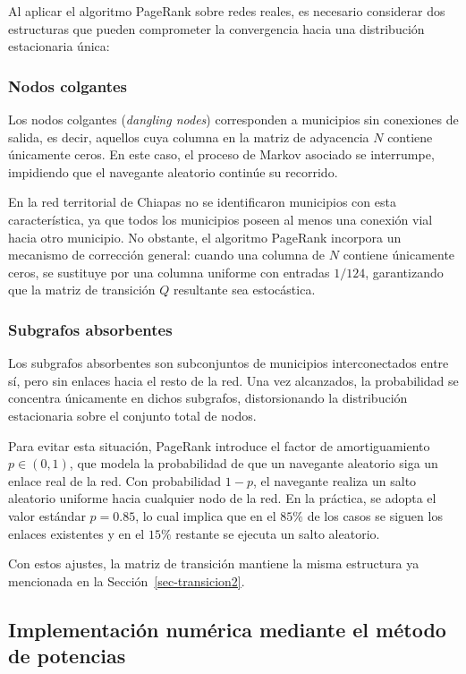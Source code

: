 \documentclass[
  spanish,
  us-letterpaper,
]{scrreprt}
\numberwithin{equation}{section}
\begin{document}
Al aplicar el algoritmo PageRank sobre redes reales, es necesario
considerar dos estructuras que pueden comprometer la convergencia hacia
una distribución estacionaria única:

\subsubsection{Nodos colgantes}\label{nodos-colgantes}

Los nodos colgantes (\emph{dangling nodes}) corresponden a municipios
sin conexiones de salida, es decir, aquellos cuya columna en la matriz
de adyacencia \(N\) contiene únicamente ceros. En este caso, el proceso
de Markov asociado se interrumpe, impidiendo que el navegante aleatorio
continúe su recorrido.

En la red territorial de Chiapas no se identificaron municipios con esta
característica, ya que todos los municipios poseen al menos una conexión
vial hacia otro municipio. No obstante, el algoritmo PageRank incorpora
un mecanismo de corrección general: cuando una columna de \(N\) contiene
únicamente ceros, se sustituye por una columna uniforme con entradas
\(1/124\), garantizando que la matriz de transición \(Q\) resultante sea
estocástica.

\subsubsection{Subgrafos absorbentes}\label{subgrafos-absorbentes}

Los subgrafos absorbentes son subconjuntos de municipios interconectados
entre sí, pero sin enlaces hacia el resto de la red. Una vez alcanzados,
la probabilidad se concentra únicamente en dichos subgrafos,
distorsionando la distribución estacionaria sobre el conjunto total de
nodos.

Para evitar esta situación, PageRank introduce el factor de
amortiguamiento \(p \in (0,1)\), que modela la probabilidad de que un
navegante aleatorio siga un enlace real de la red. Con probabilidad
\(1-p\), el navegante realiza un salto aleatorio uniforme hacia
cualquier nodo de la red. En la práctica, se adopta el valor estándar
\(p = 0.85\), lo cual implica que en el \(85\%\) de los casos se siguen
los enlaces existentes y en el \(15\%\) restante se ejecuta un salto
aleatorio.

Con estos ajustes, la matriz de transición mantiene la misma estructura
ya mencionada en la Sección~\ref{sec-transicion2}.

\subsection{Implementación numérica mediante el método de
potencias}\label{implementaciuxf3n-numuxe9rica-mediante-el-muxe9todo-de-potencias}
\end{document}
